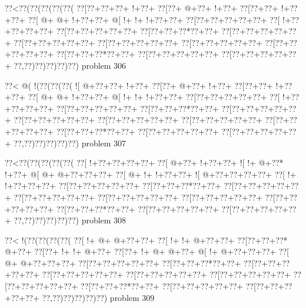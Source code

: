 \vbox{\vbox{\goo
\0??<\0??(\0??(\0??(\0??(\0??(
\0??[\0??+\0??+\0??+\- !+\0??+
\0??[\0??+\- @+\0??+\- !+\0??+
\0??[\0??+\0??+\- !+\0??+\0??+
\0??[\- @+\- @+\- !+\0??+\0??+
\- @[\- !+\- !+\- !+\0??+\0??+
\0??[\0??+\0??+\0??+\0??+\0??+
\0??[\- !+\0??+\0??+\0??+\0??+
\0??[\0??+\0??+\0??+\0??+\0??+
\0??[\0??+\0??+\0??*\0??+\0??+
\0??[\0??+\0??+\0??+\0??+\0??+
\0??[\0??+\0??+\0??+\0??+\0??+
\0??[\0??+\0??+\0??+\0??+\0??+
\0??[\0??+\0??+\0??+\0??+\0??+
\0??[\0??+\0??+\0??+\0??+\0??+
\0??[\0??+\0??+\0??*\0??+\0??+
\0??[\0??+\0??+\0??+\0??+\0??+
\0??[\0??+\0??+\0??+\0??+\0??+
\0??,\0??)\0??)\0??)\0??)\0??)
}
\hfil problem 306\hfil\break
}

\vbox{\vbox{\goo
\0??<\- @(\- !(\0??(\0??(\0??(
\- ![\- @+\0??+\0??+\- !+\0??+
\0??[\0??+\- @+\0??+\- !+\0??+
\0??[\0??+\0??+\- !+\0??+\0??+
\0??[\- @+\- @+\- !+\0??+\0??+
\- @[\- !+\- !+\- !+\0??+\0??+
\0??[\0??+\0??+\0??+\0??+\0??+
\0??[\- !+\0??+\0??+\0??+\0??+
\0??[\0??+\0??+\0??+\0??+\0??+
\0??[\0??+\0??+\0??*\0??+\0??+
\0??[\0??+\0??+\0??+\0??+\0??+
\0??[\0??+\0??+\0??+\0??+\0??+
\0??[\0??+\0??+\0??+\0??+\0??+
\0??[\0??+\0??+\0??+\0??+\0??+
\0??[\0??+\0??+\0??+\0??+\0??+
\0??[\0??+\0??+\0??*\0??+\0??+
\0??[\0??+\0??+\0??+\0??+\0??+
\0??[\0??+\0??+\0??+\0??+\0??+
\0??,\0??)\0??)\0??)\0??)\0??)
}
\hfil problem 307\hfil\break
}

\vbox{\vbox{\goo
\0??<\0??(\0??(\0??(\0??(\0??(
\0??[\- !+\0??+\0??+\0??+\0??+
\0??[\- @+\0??+\- !+\0??+\0??+
\- ![\- !+\- @+\0??*\- !+\0??+
\- @[\- @+\- @+\0??+\0??+\0??+
\0??[\- @+\- !+\- !+\0??+\0??+
\- ![\- @+\0??+\0??+\0??+\0??+
\0??[\- !+\- !+\0??+\0??+\0??+
\0??[\0??+\0??+\0??+\0??+\0??+
\0??[\0??+\0??+\0??*\0??+\0??+
\0??[\0??+\0??+\0??+\0??+\0??+
\0??[\0??+\0??+\0??+\0??+\0??+
\0??[\0??+\0??+\0??+\0??+\0??+
\0??[\0??+\0??+\0??+\0??+\0??+
\0??[\0??+\0??+\0??+\0??+\0??+
\0??[\0??+\0??+\0??*\0??+\0??+
\0??[\0??+\0??+\0??+\0??+\0??+
\0??[\0??+\0??+\0??+\0??+\0??+
\0??,\0??)\0??)\0??)\0??)\0??)
}
\hfil problem 308\hfil\break
}

\vbox{\vbox{\goo
\0??<\- !(\0??(\0??(\0??(\0??(
\0??[\- !+\- @+\- @+\0??+\0??+
\0??[\- !+\- !+\- @+\0??+\0??+
\0??[\0??+\0??+\0??*\- @+\0??+
\0??[\0??+\- !+\- !+\- @+\0??+
\0??[\0??+\- !+\- @+\- @+\0??+
\- @[\- !+\- @+\0??+\0??+\0??+
\0??[\- @+\- @+\0??+\0??+\0??+
\0??[\0??+\0??+\0??+\0??+\0??+
\0??[\0??+\0??+\0??*\0??+\0??+
\0??[\0??+\0??+\0??+\0??+\0??+
\0??[\0??+\0??+\0??+\0??+\0??+
\0??[\0??+\0??+\0??+\0??+\0??+
\0??[\0??+\0??+\0??+\0??+\0??+
\0??[\0??+\0??+\0??+\0??+\0??+
\0??[\0??+\0??+\0??*\0??+\0??+
\0??[\0??+\0??+\0??+\0??+\0??+
\0??[\0??+\0??+\0??+\0??+\0??+
\0??,\0??)\0??)\0??)\0??)\0??)
}
\hfil problem 309\hfil\break
}


